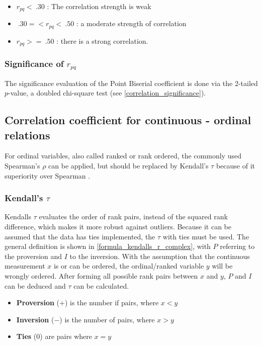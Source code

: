 \begin{itemize}
	\item $r_{pq} < \: .30$ : The correlation strength is weak
	\item $\: .30 =< r_{pq} < \: .50$ : a moderate strength of correlation
	\item $r_{pq} >= \: .50$ : there is a strong correlation.
\end{itemize}

\subsubsection{Significance of $r_{pq}$}
The significance evaluation of the Point Biserial coefficient is done via the 2-tailed $p$-value, a doubled chi-square test (see \cref{correlation_significance}).

\subsection{Correlation coefficient for continuous - ordinal relations}
For ordinal variables, also called ranked or rank ordered, the commonly used Spearman's $\rho$ can be applied, but should be replaced by Kendall's $\tau$ because of it superiority over Spearman \parencite{Newson2002}. 

\subsubsection{Kendall's $\tau$}
Kendalls $\tau$ evaluates the order of rank pairs, instead of the squared rank difference, which makes it more robust against outliers. Because it can be assumed that the data has ties implemented, the $\tau$ with ties must be used. The general definition is shown in \cref{formula_kendalls_r_complex}, with $P$ referring to the proversion and $I$ to the inversion. With the assumption that the continuous measurement $x$ is or can be ordered, the ordinal/ranked variable $y$ will be wrongly ordered. After forming all possible rank pairs between $x$ and $y$, $P$ and $I$ can be deduced and $\tau$ can be calculated. \parencite{Reiter2015,Bossart2017}

\begin{itemize}	
	\item[] \textbf{Proversion} ($+$) is the number if pairs, where $x < y$ 
	\item[] \textbf{Inversion} ($-$) is the number of pairs, where $x > y$ 
	\item[] \textbf{Ties} ($0$) are pairs where $x = y$
\end{itemize}

